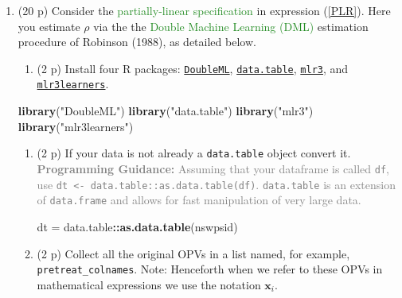 \documentclass[
]{article}
\newenvironment{Shaded}{\begin{snugshade}}{\end{snugshade}}
\newcommand{\FunctionTok}[1]{\textcolor[rgb]{0.13,0.29,0.53}{\textbf{#1}}}
\newcommand{\NormalTok}[1]{#1}
\newcommand{\OtherTok}[1]{\textcolor[rgb]{0.56,0.35,0.01}{#1}}
\newcommand{\SpecialCharTok}[1]{\textcolor[rgb]{0.81,0.36,0.00}{\textbf{#1}}}
\newcommand{\StringTok}[1]{\textcolor[rgb]{0.31,0.60,0.02}{#1}}
\providecommand{\tightlist}{%
  \setlength{\itemsep}{0pt}\setlength{\parskip}{0pt}}
\begin{document}
\pagebreak

\begin{enumerate}
\def\labelenumi{\arabic{enumi}.}
\setcounter{enumi}{6}
\item
  (20 p) Consider the
  \textcolor{ForestGreen}{partially-linear specification} in expression
  (\ref{PLR}). Here you estimate \(\rho\) via the the
  \textcolor{ForestGreen}{Double Machine Learning (DML)} estimation
  procedure of Robinson (1988), as detailed below.\label{item:DML}

  \begin{enumerate}
  \def\labelenumii{\alph{enumii}.}
  \tightlist
  \item
    (2 p) Install four R packages:
    \href{https://docs.doubleml.org/stable/intro/install.html#r-installing-doubleml}{\texttt{DoubleML}},
    \href{https://cran.r-project.org/web/packages/data.table/vignettes/datatable-intro.html}{\texttt{data.table}},
    \href{https://mlr3.mlr-org.com/}{\texttt{mlr3}}, and
    \href{https://mlr3learners.mlr-org.com/}{\texttt{mlr3learners}}.
  \end{enumerate}

\begin{Shaded}
\begin{Highlighting}[]
\FunctionTok{library}\NormalTok{(}\StringTok{"DoubleML"}\NormalTok{)}
\FunctionTok{library}\NormalTok{(}\StringTok{"data.table"}\NormalTok{)}
\FunctionTok{library}\NormalTok{(}\StringTok{"mlr3"}\NormalTok{)}
\FunctionTok{library}\NormalTok{(}\StringTok{"mlr3learners"}\NormalTok{)}
\end{Highlighting}
\end{Shaded}

  \begin{enumerate}
  \def\labelenumii{\alph{enumii}.}
  \setcounter{enumii}{1}
  \item
    (2 p) If your data is not already a \texttt{data.table} object
    convert it.
    \textcolor{gray}{\textbf{Programming Guidance:} Assuming that your dataframe is called \texttt{df}, use \texttt{dt <- data.table::as.data.table(df)}. \texttt{data.table} is an extension of \texttt{data.frame} and allows for fast manipulation of very large data.}

\begin{Shaded}
\begin{Highlighting}[]
\NormalTok{dt }\OtherTok{=}\NormalTok{ data.table}\SpecialCharTok{::}\FunctionTok{as.data.table}\NormalTok{(nswpsid)}
\end{Highlighting}
\end{Shaded}
  \item
    (2 p) Collect all the original OPVs in a list named, for example,
    \texttt{pretreat\_colnames}. Note: Henceforth when we refer to these
    OPVs in mathematical expressions we use the notation
    \(\mathbf{x}_{i}\).


\end{enumerate}
\end{enumerate}
\end{document}
